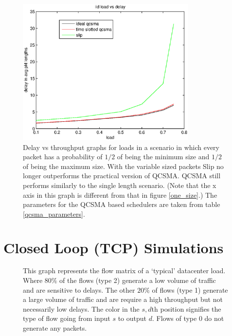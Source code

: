 \documentclass{IEEEtran}%
\begin{document}
\begin{figure}%
	 \includegraphics[width=90mm]{vs_load.eps}
	 \caption{Delay vs throughput graphs for loads in a scenario in which every packet has a probability of $1/2$ of being the minimum size and $1/2$ of being the maximum size. With the variable sized packets Slip no longer outperforms the practical version of QCSMA.  QCSMA still performs similarly to the single length scenario.  (Note that the x axis in this graph is different from that in figure \ref{one_size}.) The parameters for the QCSMA based schedulers are taken from table \ref{qcsma_parameters}.} 	
	\label{variable_size}
\end{figure}

\section{Closed Loop (TCP) Simulations}
\begin{figure}%
	\caption{This graph represents the flow matrix of a `typical' datacenter load.  Where $80\%$ of the flows (type 2) generate a low volume of traffic and are sensitive to delays.  The other $20\%$ of flows (type 1) generate a large volume of traffic and are require a high throughput but not necessarily low delays.  The color in the $s,d$th position signifies the type of flow going from input $s$ to output $d$.  Flows of type $0$ do not generate any packets.} 	
	\label{typical_flows}
\end{figure}
\end{document}

